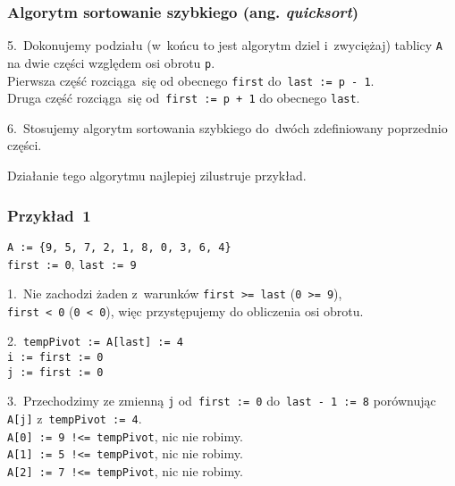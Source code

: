 \documentclass[10pt,t]{beamer}
\begin{document}
\begin{frame}
  \frametitle{Algorytm sortowanie szybkiego (ang.
    \textit{quicksort})}


  5.~Dokonujemy podziału (w~końcu to jest algorytm dziel i~zwyciężaj)
  tablicy \texttt{A} na dwie części względem osi obrotu \texttt{p}. \\
  Pierwsza część rozciąga~się od obecnego \texttt{first}
  do~\texttt{last := p - 1}. \\
  Druga część rozciąga~się od~\texttt{first := p + 1} do obecnego
  \texttt{last}.

  6.~Stosujemy algorytm sortowania szybkiego do~dwóch zdefiniowany
  poprzednio części.

  Działanie tego algorytmu najlepiej zilustruje przykład.

\end{frame}





\begin{frame}
  \frametitle{Przykład~1}


  \texttt{A := \{9, 5, 7, 2, 1, 8, 0, 3, 6, 4\} } \\
  \texttt{first := 0}, \texttt{last := 9}

  1.~Nie zachodzi żaden z~warunków \texttt{first >= last}
  (\texttt{0 >= 9}), \\
  \texttt{first < 0} (\texttt{0 < 0}), więc przystępujemy do obliczenia
  osi obrotu.

  2.~\texttt{tempPivot := A[last] := 4} \\
  \texttt{i := first := 0} \\
  \texttt{j := first := 0}

  3.~Przechodzimy ze zmienną \texttt{j} od~\texttt{first := 0}
  do~\texttt{last - 1 := 8} porównując \texttt{A[j]}
  z~\texttt{tempPivot := 4}. \\
  \texttt{A[0] := 9 !<= tempPivot}, nic nie robimy. \\
  \texttt{A[1] := 5 !<= tempPivot}, nic nie robimy. \\
  \texttt{A[2] := 7 !<= tempPivot}, nic nie robimy. \\

\end{frame}
\end{document}
